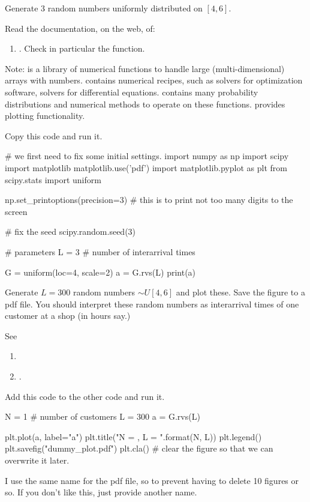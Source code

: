 \documentclass{scrartcl}
\begin{document}
\begin{exercise}
  Generate 3 random numbers uniformly distributed on $[4,6]$. 

  Read the documentation, on the web, of:
  \begin{enumerate}
  \item  {}.  Check in particular the  function. 
  \end{enumerate}

  Note:  is a library of numerical functions to handle large (multi-dimensional) arrays with numbers.  contains numerical recipes, such as solvers for optimization software, solvers for differential equations.  contains many probability distributions and numerical methods to operate on these functions.  provides plotting functionality.
\begin{solution}
Copy this code and run it.
\begin{pyverbatim}
# we first need to fix some initial settings.
import numpy as np
import scipy
import matplotlib
matplotlib.use('pdf') 
import matplotlib.pyplot as plt
from scipy.stats import uniform

np.set_printoptions(precision=3) # this is to print not too many digits to the screen

# fix the seed
scipy.random.seed(3) 

# parameters
L = 3  # number of interarrival times

G = uniform(loc=4, scale=2) 
a = G.rvs(L)
print(a)
\end{pyverbatim}
  
\end{solution}

\end{exercise}


\begin{exercise}
Generate $L=300$ random numbers $\sim U[4,6]$ and plot these. Save the figure to a pdf file. You should interpret these random numbers as interarrival times of one customer at a shop (in hours say.)

See
\begin{enumerate}
\item  {}
\item {}.
\end{enumerate}
\begin{solution}
Add this code to the other code and run it.
\begin{pyverbatim}
N = 1 # number of customers
L = 300
a = G.rvs(L)

plt.plot(a, label="a")
plt.title("N = {}, L = {}".format(N, L))
plt.legend()
plt.savefig("dummy_plot.pdf")
plt.cla() # clear the figure so that we can overwrite it later.
\end{pyverbatim}
I use the same name for the pdf file, so to prevent having to delete 10 figures or so. If you don't like this, just provide another name. 
\end{solution}
\end{exercise}
\end{document}
